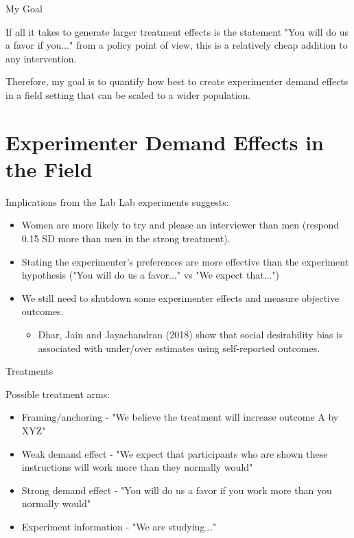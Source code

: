 \documentclass[aspectratio=169,xcolor=dvipsnames]{beamer}
\begin{document}
\begin{frame}{My Goal}

    If all it takes to generate larger treatment effects is the 
    statement "You will do us a favor if you..." from a policy point of view, this is a relatively cheap addition to any 
    intervention.

    \vfill
    Therefore, my goal is to quantify how best to create experimenter demand effects in a field 
    setting that can be scaled to a wider population. 

\end{frame}

\section{Experimenter Demand Effects in the Field}



\begin{frame}{Implications from the Lab}
    Lab experiments suggests:
    \begin{itemize}
            \item Women are more likely to try and please an interviewer than men (respond 0.15 SD 
            more than men in the strong treatment).
            \item Stating the experimenter's preferences are more effective than the 
            experiment hypothesis ("You will do us a favor..." vs "We expect that...")
            \item We still need to shutdown some experimenter effects and measure objective outcomes.
            \begin{itemize}
                \item Dhar, Jain and Jayachandran (2018) show that social desirability bias is 
                associated with under/over estimates using self-reported outcomes. 
            \end{itemize}
    \end{itemize}
\end{frame}



\begin{frame}{Treatments}


    Possible treatment arms:

    \begin{itemize}
        \item Framing/anchoring - "We believe the treatment will increase outcome A by XYZ"
        \item Weak demand effect - "We expect that participants who are shown these instructions will 
        work more than they normally would"
        \item Strong demand effect - "You will do us a favor if you work more than you normally would" 
        \item Experiment information - "We are studying..."
    \end{itemize}
    

\end{frame}
\end{document}
